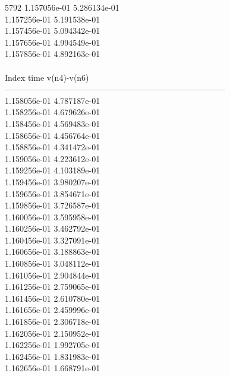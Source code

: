 5792	1.157056e-01	5.286134e-01	\\ 	1.157256e-01	5.191538e-01	\\ 	1.157456e-01	5.094342e-01	\\ 	1.157656e-01	4.994549e-01	\\ 	1.157856e-01	4.892163e-01	\\ \hline
\\ \hline
Index   time            v(n4)-v(n6)     \\ \hline
--------------------------------------------------------------------------------\\ 	1.158056e-01	4.787187e-01	\\ 	1.158256e-01	4.679626e-01	\\ 	1.158456e-01	4.569483e-01	\\ 	1.158656e-01	4.456764e-01	\\ 	1.158856e-01	4.341472e-01	\\ 	1.159056e-01	4.223612e-01	\\ 	1.159256e-01	4.103189e-01	\\ 	1.159456e-01	3.980207e-01	\\ 	1.159656e-01	3.854671e-01	\\ 	1.159856e-01	3.726587e-01	\\ 	1.160056e-01	3.595958e-01	\\ 	1.160256e-01	3.462792e-01	\\ 	1.160456e-01	3.327091e-01	\\ 	1.160656e-01	3.188863e-01	\\ 	1.160856e-01	3.048112e-01	\\ 	1.161056e-01	2.904844e-01	\\ 	1.161256e-01	2.759065e-01	\\ 	1.161456e-01	2.610780e-01	\\ 	1.161656e-01	2.459996e-01	\\ 	1.161856e-01	2.306718e-01	\\ 	1.162056e-01	2.150952e-01	\\ 	1.162256e-01	1.992705e-01	\\ 	1.162456e-01	1.831983e-01	\\ 	1.162656e-01	1.668791e-01	\\ \hline
